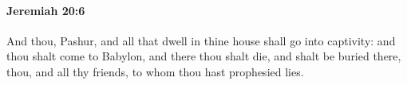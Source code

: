 
		\paragraph{Jeremiah 20:6} %
			\label{JEREMIAH-20-6}

			And thou, Pashur, and all that dwell in thine house shall go into captivity: and thou shalt come to Babylon, and there thou shalt die, and shalt be buried there, thou, and all thy friends, to whom thou hast prophesied lies.


